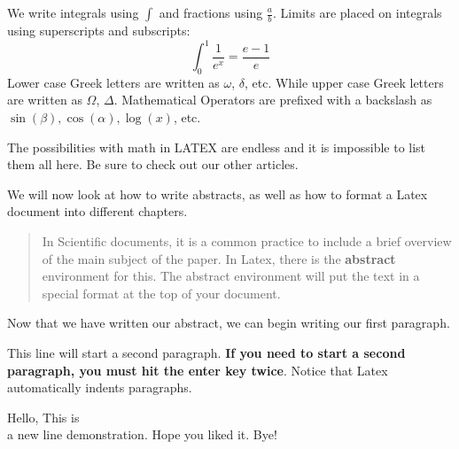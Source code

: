 \documentclass[12pt, letterpaper, twoside]{article}
\begin{document}
We write integrals using \begin{math}\int\end{math} and fractions using \begin{math}\frac{a}{b}\end{math}. Limits are placed on integrals using superscripts and subscripts:
\begin{displaymath}
\int_0^1 \frac{1}{e^x} = \frac{e-1}{e}
\end{displaymath}
Lower case Greek letters are written as \begin{math}\omega\end{math}, \begin{math}\delta\end{math}, etc.
While upper case Greek letters are written as \begin{math}\Omega\end{math}, \begin{math}\Delta\end{math}.
Mathematical Operators are prefixed with a backslash as \begin{math}\sin(\beta),\cos(\alpha),\log(x)\end{math}, etc.

The possibilities with math in LATEX are endless and it is impossible to list them all here. Be sure to check out our other articles.


We will now look at how to write abstracts, as well as how to format a Latex document into different chapters. 

\begin{abstract}
In Scientific documents, it is a common practice to include a brief overview of the main subject of the paper. In Latex, there is the \textbf{abstract} environment for this. The abstract environment will put the text in a special format at the top of your document.     
\end{abstract}

Now that we have written our abstract, we can begin writing our first paragraph. 

This line will start a second paragraph. \textbf{If you need to start a second paragraph, you must hit the enter key twice}. Notice that Latex automatically indents paragraphs. 

Hello, This is 
\\ a new line demonstration. 
\newline Hope you liked it. Bye! 
\end{document}
